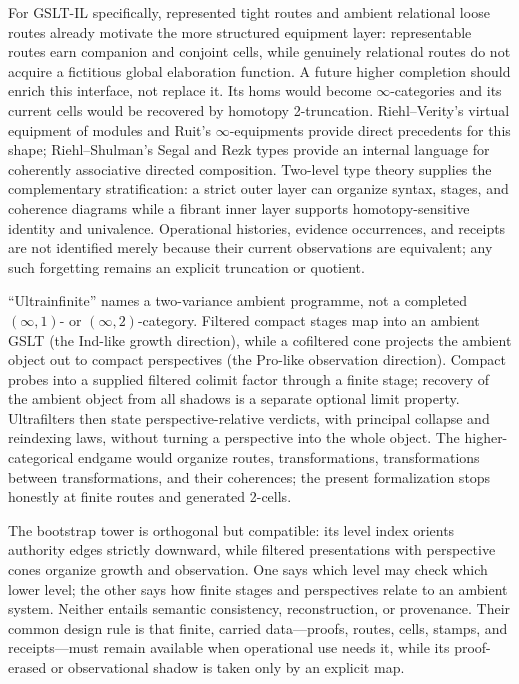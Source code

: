 \documentclass[11pt]{article}
\begin{document}
For GSLT-IL specifically, represented tight routes and ambient relational loose
routes already motivate the more structured equipment layer: representable
routes earn companion and conjoint cells, while genuinely relational routes do
not acquire a fictitious global elaboration function.  A future higher
completion should enrich this interface, not replace it.  Its homs would become
$\infty$-categories and its current cells would be recovered by homotopy
2-truncation.  Riehl--Verity's virtual equipment of modules and Ruit's
$\infty$-equipments provide direct precedents for this shape; Riehl--Shulman's
Segal and Rezk types provide an internal language for coherently associative
directed composition.  Two-level type theory supplies the complementary
stratification: a strict outer layer can organize syntax, stages, and coherence
diagrams while a fibrant inner layer supports homotopy-sensitive identity and
univalence.  Operational histories, evidence occurrences, and receipts are not
identified merely because their current observations are equivalent; any such
forgetting remains an explicit truncation or quotient.

``Ultrainfinite'' names a two-variance ambient programme, not a completed
$(\infty,1)$- or $(\infty,2)$-category.  Filtered compact stages map into an
ambient GSLT (the Ind-like growth direction), while a cofiltered cone projects
the ambient object out to compact perspectives (the Pro-like observation
direction).  Compact probes into a supplied filtered colimit factor through a
finite stage; recovery of the ambient object from all shadows is a separate
optional limit property.  Ultrafilters then state perspective-relative verdicts,
with principal collapse and reindexing laws, without turning a perspective into
the whole object.  The higher-categorical endgame would organize routes,
transformations, transformations between transformations, and their coherences;
the present formalization stops honestly at finite routes and generated 2-cells.

The bootstrap tower is orthogonal but compatible: its level index orients
authority edges strictly downward, while filtered presentations with perspective
cones organize growth and
observation.  One says which level may check which lower level; the other says how
finite stages and perspectives relate to an ambient system.  Neither entails
semantic consistency, reconstruction, or provenance.  Their common design rule
is that finite, carried data---proofs, routes, cells, stamps, and receipts---must
remain available when operational use needs it, while its proof-erased or
observational shadow is taken only by an explicit map.
\end{document}

